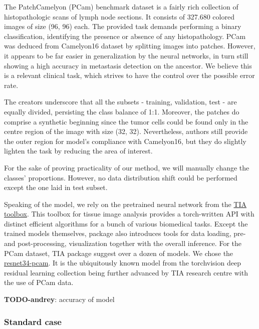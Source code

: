 \documentclass{article}
\newcommand{\todo}[2]{{\color{red} {\bf TODO-#1}: #2}}
\begin{document}
The PatchCamelyon (PCam) benchmark dataset is a fairly rich collection of histopathologic scans of lymph node sections. It consists of 327.680 colored images of size (96, 96) each. The provided task demands performing a binary classification, identifying the presence or absence of any histopathology. PCam was deduced from Camelyon16 dataset by splitting images into patches. However, it appears to be far easier in generalization by the neural networks, in turn still showing a high accuracy in metastasis detection on the ancestor. We believe this is a relevant clinical task, which strives to have the control over the possible error rate.

The creators underscore that all the subsets - training, validation, test - are equally divided, persisting the class balance of 1:1. Moreover, the patches do comprise a synthetic beginning since the tumor cells could be found only in the centre region of the image with size (32, 32). Nevertheless, authors still provide the outer region for model's compliance with Camelyon16, but they do slightly lighten the task by reducing the area of interest.

For the sake of proving practicality of our method, we will manually change the classes' proportions. However, no data distribution shift could be performed except the one laid in test subset.

Speaking of the model, we rely on the pretrained neural network from the \href{https://tiatoolbox.readthedocs.io}{TIA toolbox}. This toolbox for tissue image analysis provides a torch-written API with distinct efficient algorithms for a bunch of various biomedical tasks. Except the trained models themselves, package also introduces tools for data loading, pre- and post-processing, visualization together with the overall inference. For the PCam dataset, TIA package suggest over a dozen of models. We chose the \href{https://huggingface.co/1aurent/resnet34.tiatoolbox-pcam}{resnet34-pcam}. It is the ubiquitously known model from the torchvision deep residual learning collection being further advanced by TIA research centre with the use of PCam data.

\todo{andrey}{accuracy of model}

\subsubsection{Standard case}
\end{document}
